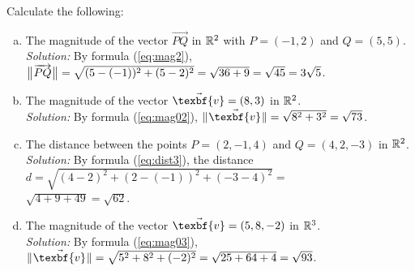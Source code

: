 \newpage
\begin{exmp}
 Calculate the following:
 \begin{enumerate}[(a)]
  \item The magnitude of the vector $\overrightarrow{PQ}$ in $\mathbb{R}^{2}$ with $P = (-1,2)$ and
   $Q = (5,5)$.\\\emph{Solution:} By formula (\ref{eq:mag2}), $\bigl\lVert\mspace{1mu}\overrightarrow{PQ}\mspace{1mu}\bigr\rVert =
   \sqrt{(5 - (-1))^2 + (5 - 2)^2} = \sqrt{36 + 9} = \sqrt{45} = 3 \sqrt{5}$.
  \item The magnitude of the vector $\vec{\texbf{v}} = (8,3)$ in $\mathbb{R}^{2}$.\\\emph{Solution:} By formula
   (\ref{eq:mag02}), $\norm{\vec{\texbf{v}}} = \sqrt{8^2 + 3^2} = \sqrt{73}$.
  \item The distance between the points $P = (2, -1, 4)$ and $Q = (4, 2, -3)$ in $\mathbb{R}^{2}$.\\\emph{Solution:}
   By formula (\ref{eq:dist3}), the distance $d = \sqrt{(4 - 2)^2 + (2 - (-1))^2 + (-3 - 4)^2} =$\\$\sqrt{4 + 9 + 49} =
   \sqrt{62}$.
  \item The magnitude of the vector $\vec{\texbf{v}} = (5,8,-2)$ in $\mathbb{R}^{3}$.\\\emph{Solution:} By formula
   (\ref{eq:mag03}), $\norm{\vec{\texbf{v}}} = \sqrt{5^2 + 8^2 + (-2)^2} = \sqrt{25 + 64 + 4} = \sqrt{93}$.\vspace{-4mm}
 \end{enumerate}
\end{exmp}
\startexercises\label{sec1dot1}
